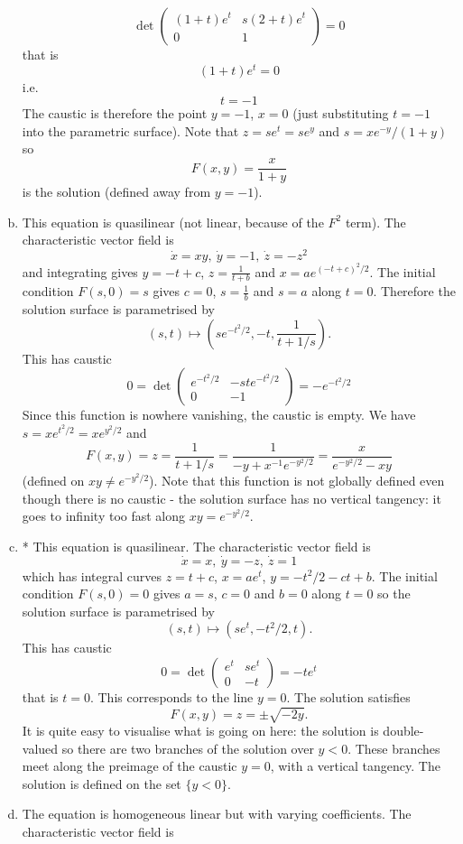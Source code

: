 \documentclass[12pt]{article}
\begin{document}
\begin{answer}
\begin{enumerate}[(a)]
\[\det\left(\begin{array}{cc}
(1+t)e^t & s(2+t)e^{t}\\
0 & 1
\end{array}\right)=0\]
that is
\[(1+t)e^t=0\]
i.e.
\[t=-1\]
The caustic is therefore the point $y=-1$, $x=0$ (just substituting $t=-1$ into the parametric surface). Note that $z=se^t=se^y$ and $s=xe^{-y}/(1+y)$ so
\[F(x,y)=\frac{x}{1+y}\]
is the solution (defined away from $y=-1$).
\item This equation is quasilinear (not linear, because of the $F^2$ term). The characteristic vector field is
\[\dot{x}=xy,\ \dot{y}=-1,\ \dot{z}=-z^2\]
and integrating gives $y=-t+c$, $z=\frac{1}{t+b}$ and $x=ae^{(-t+c)^2/2}$. The initial condition $F(s,0)=s$ gives $c=0$, $s=\frac{1}{b}$ and $s=a$ along $t=0$. Therefore the solution surface is parametrised by
\[(s,t)\mapsto \left(se^{-t^2/2},-t,\frac{1}{t+1/s}\right).\]
This has caustic
\[0=\det\left(\begin{array}{cc}
e^{-t^2/2} & -ste^{-t^2/2}\\
0 & -1
\end{array}\right)=-e^{-t^2/2}\]
Since this function is nowhere vanishing, the caustic is empty. We have $s=xe^{t^2/2}=xe^{y^2/2}$ and
\[F(x,y)=z=\frac{1}{t+1/s}=\frac{1}{-y+x^{-1}e^{-y^2/2}}=\frac{x}{e^{-y^2/2}-xy}\]
(defined on $xy\neq e^{-y^2/2}$). Note that this function is not globally defined even though there is no caustic - the solution surface has no vertical tangency: it goes to infinity too fast along $xy=e^{-y^2/2}$.
\item * This equation is quasilinear. The characteristic vector field is
\[\dot{x}=x,\ \dot{y}=-z,\ \dot{z}=1\]
which has integral curves $z=t+c$, $x=ae^t$, $y=-t^2/2-ct+b$.
The initial condition $F(s,0)=0$ gives $a=s$, $c=0$ and $b=0$ along $t=0$ so the solution surface is parametrised by
\[(s,t)\mapsto (se^t,-t^2/2,t).\]
This has caustic
\[0=\det\left(\begin{array}{cc}
e^t & se^t\\
0 & -t
\end{array}\right)=-te^t\]
that is $t=0$.
This corresponds to the line $y=0$. The solution satisfies
\[F(x,y)=z=\pm\sqrt{-2y}.\]
It is quite easy to visualise what is going on here: the solution is double-valued so there are two branches of the solution over $y<0$. These branches meet along the preimage of the caustic $y=0$, with a vertical tangency. The solution is defined on the set $\{y<0\}$.
\item The equation is homogeneous linear but with varying coefficients. The characteristic vector field is

\end{enumerate}
\end{answer}
\end{document}
